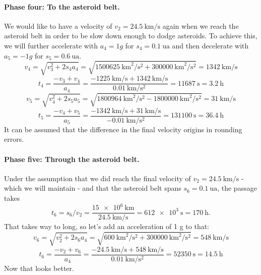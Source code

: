\documentclass[10pt]{article}
\numberwithin{equation}{section}
\begin{document}
	\paragraph{Phase four: To the asteroid belt.}
	
	We would like to have a velocity of $v_2 = \SI{24.5}{\km\per\s}$ again when we reach the asteroid belt in order to be slow down enough to dodge asteroids. To achieve this, we will further accelerate with $a_4 = 1 g$ for $s_4 = \SI{0.1}{\astronomicalunit}$ and then decelerate with $a_5 = -1 g$ for $s_5 = \SI{0.6}{\astronomicalunit}$.
	\begin{equation}
		v_4 = \sqrt{v^2_3 + 2s_4 a_4}
		= \sqrt{\SI{1500625}{\km\squared\per\s\squared} + \SI{300000}{\km\squared\per\s\squared}}
		= \SI{1342}{\km\per\s} \end{equation}
	\begin{equation}
		t_4 = \frac{-v_3 + v_4}{a_4}
		= \frac{\SI{-1225}{\km\per\s} + \SI{1342}{\km\per\s}}{\SI{0.01}{\km\per\s\squared}}
		= \SI{11687}{\s} = \SI{3.2}{\hour} \end{equation}
	\begin{equation}
		v_5 = \sqrt{v^2_4 + 2s_5 a_5}
		= \sqrt{\SI{1800964}{\km\squared\per\s\squared} - \SI{1800000}{\km\squared\per\s\squared}}
		= \SI{31}{\km\per\s} \end{equation}
	\begin{equation}
		t_5 = \frac{-v_4 + v_5}{a_5}
		= \frac{\SI{-1342}{\km\per\s} + \SI{31}{\km\per\s}}{\SI{-0.01}{\km\per\s\squared}}
		= \SI{131100}{\s} = \SI{36.4}{\hour} \end{equation}
	It can be assumed that the difference in the final velocity origins in rounding errors.
	
	\paragraph{Phase five: Through the asteroid belt.}
	
	Under the assumption that we did reach the final velocity of $v_2 = \SI{24.5}{\km\per\s}$ - which we will maintain - and that the asteroid belt spans $s_6 = \SI{0.1}{\astronomicalunit}$, the passage takes
	\begin{equation}
		t_6 = s_6 / v_2 = \frac{\SI{15e+6}{\km}}{\SI{24.5}{\km\per\s}} = \SI{612e+3}{\s}
		= \SI{170}{\hour}. \end{equation}
	That takes way to long, so let's add an acceleration of 1 g to that:	
	\begin{equation}
		v_6 = \sqrt{v^2_2 + 2s_6 a_4}
		= \sqrt{\SI{600}{\km\squared\per\s\squared} + \SI{300000}{\km\squared\per\s\squared}}
		= \SI{548}{\km\per\s} \end{equation}
	\begin{equation}
		t_6 = \frac{-v_2 + v_6}{a_4}
		= \frac{\SI{-24.5}{\km\per\s} + \SI{548}{\km\per\s}}{\SI{0.01}{\km\per\s\squared}}
		= \SI{52350}{\s} = \SI{14.5}{\hour} \end{equation}
	Now that looks better.
	
\end{document}
